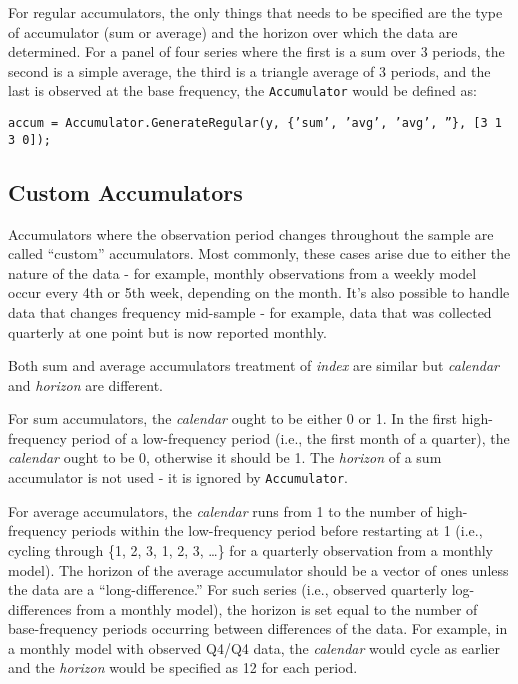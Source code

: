 \documentclass{article}
\begin{document}
For regular accumulators, the only things that needs to be specified are the type of accumulator (sum or average) and the horizon over which the data are determined. For a panel of four series where the first is a sum over 3 periods, the second is a simple average, the third is a triangle average of 3 periods, and the last is observed at the base frequency, the \texttt{Accumulator} would be defined as: 

\hspace{5mm} \texttt{accum = Accumulator.GenerateRegular(y, \{'sum', 'avg', 'avg', ''\}, [3 1 3 0]);}

\subsection{Custom Accumulators}

Accumulators where the observation period changes throughout the sample are called ``custom'' accumulators. Most commonly, these cases arise due to either the nature of the data - for example, monthly observations from a weekly model occur every 4th or 5th week, depending on the month. It's also possible to handle data that changes frequency mid-sample - for example, data that was collected quarterly at one point but is now reported monthly.

Both sum and average accumulators treatment of \emph{index} are similar but \emph{calendar} and \emph{horizon} are different. 

For sum accumulators, the \emph{calendar} ought to be either 0 or 1. In the first high-frequency period of a low-frequency period (i.e., the first month of a quarter), the \emph{calendar} ought to be 0, otherwise it should be 1. The \emph{horizon} of a sum accumulator is not used - it is ignored by \texttt{Accumulator}. 

For average accumulators, the \emph{calendar} runs from 1 to the number of high-frequency periods within the low-frequency period before restarting at 1 (i.e., cycling through \{1, 2, 3, 1, 2, 3, \dots\} for a quarterly observation from a monthly model). The horizon of the average accumulator should be a vector of ones unless the data are a ``long-difference.'' For such series (i.e., observed quarterly log-differences from a monthly model), the horizon is set equal to the number of base-frequency periods occurring between differences of the data. For example, in a monthly model with observed Q4/Q4 data, the \emph{calendar} would cycle as earlier and the \emph{horizon} would be specified as 12 for each period. 
\end{document}
